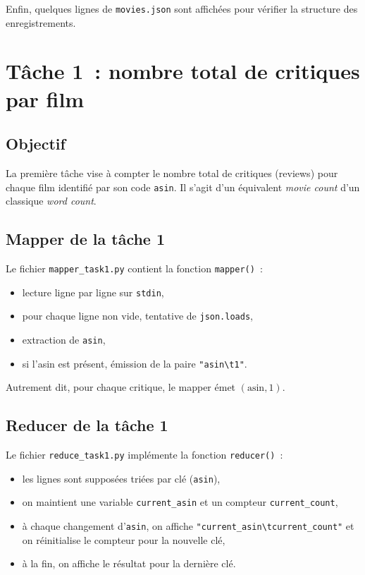 \documentclass[a4paper,11pt]{article}
\begin{document}
Enfin, quelques lignes de \texttt{movies.json} sont affichées pour
vérifier la structure des enregistrements.

\section{Tâche 1~: nombre total de critiques par film}

\subsection{Objectif}

La première tâche vise à compter le nombre total de critiques
(reviews) pour chaque film identifié par son code \texttt{asin}.
Il s'agit d'un équivalent \emph{movie count} d'un classique
\emph{word count}.

\subsection{Mapper de la tâche 1}

Le fichier \texttt{mapper\_task1.py} contient la fonction \texttt{mapper()}~:
\begin{itemize}
  \item lecture ligne par ligne sur \texttt{stdin},\
  \item pour chaque ligne non vide, tentative de \texttt{json.loads},\
  \item extraction de \texttt{asin},\
  \item si l'asin est présent, émission de la paire
        \texttt{"asin\textbackslash t1"}.
\end{itemize}

Autrement dit, pour chaque critique, le mapper émet
\((\text{asin}, 1)\).

\subsection{Reducer de la tâche 1}

Le fichier \texttt{reduce\_task1.py} implémente la fonction
\texttt{reducer()}~:
\begin{itemize}
  \item les lignes sont supposées triées par clé (\texttt{asin}),\
  \item on maintient une variable \texttt{current\_asin} et un compteur
        \texttt{current\_count},\
  \item à chaque changement d'\texttt{asin}, on affiche
        \texttt{"current\_asin\textbackslash tcurrent\_count"} et on
        réinitialise le compteur pour la nouvelle clé,\
  \item à la fin, on affiche le résultat pour la dernière clé.
\end{itemize}
\end{document}
